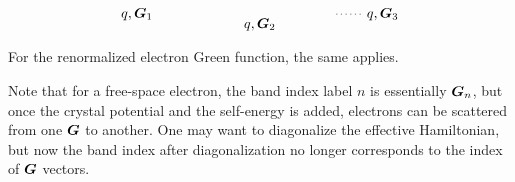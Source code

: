 \documentclass[hyperref, a4paper, 12pt]{report}
\begin{document}
\[\begin{tikzpicture}[x=0.75pt,y=0.75pt,yscale=-1,xscale=1]
        \draw  [dash pattern={on 0.84pt off 2.51pt}]  (270.51,70) -- (296.52,70) ;
        
        \draw (96.5,70) node [anchor=east] [inner sep=0.75pt]    {$q,\vb*{G}_{1}$};
        \draw (197.51,73) node [anchor=north] [inner sep=0.75pt]    {$q,\vb*{G}_{2}$};
        \draw (298.52,70) node [anchor=west] [inner sep=0.75pt]    {$q,\vb*{G}_{3}$};
        \end{tikzpicture}        
\]
For the renormalized electron Green function, 
the same applies. 

Note that for a free-space electron, 
the band index label $n$ is essentially $\vb*{G}_n$,
but once the crystal potential 
and the self-energy is added,
electrons can be scattered from one $\vb*{G}$ to another.
One may want to diagonalize the effective Hamiltonian,
but now the band index after diagonalization 
no longer corresponds to the index of $\vb*{G}$ vectors.
\end{document}
